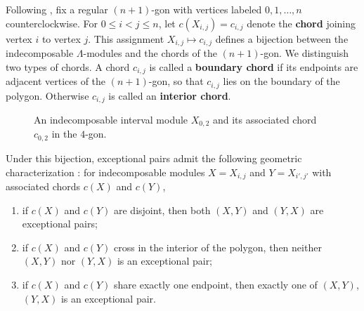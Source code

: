 \documentclass[12pt]{amsart}
\theoremstyle{definition}
\theoremstyle{remark}
\numberwithin{equation}{section}
\newcommand{\kk}{\ensuremath{\Bbbk}}
\begin{document}
Following \cite{araya2013exceptional}, fix a regular $(n+1)$-gon with vertices labeled $0, 1, \dots, n$ counterclockwise. For $0 \le i < j \le n$, let $c(X_{i,j}) = c_{i,j}$ denote the \textbf{chord} joining vertex $i$ to vertex $j$. This assignment $X_{i,j} \mapsto c_{i,j}$ defines a bijection between the indecomposable $\Lambda$-modules and the chords of the $(n+1)$-gon. We distinguish two types of chords. A chord $c_{i,j}$ is called a \textbf{boundary chord} if its endpoints are adjacent vertices of the $(n+1)$-gon, so that $c_{i,j}$ lies on the boundary of the polygon. Otherwise $c_{i,j}$ is called an \textbf{interior chord}.

\begin{figure}[h]
\centering
{}
\caption{An indecomposable interval module $X_{0,2}$ and its associated chord $c_{0,2}$ in the $4$-gon.}
\label{fig: interval module}
\end{figure}

Under this bijection, exceptional pairs admit the following geometric characterization \cite[Lemma~3.2]{araya2013exceptional}: for indecomposable modules $X = X_{i,j}$ and $Y = X_{i',j'}$ with associated chords $c(X)$ and $c(Y)$,
\begin{enumerate}[label=(\arabic*)]
    \item if $c(X)$ and $c(Y)$ are disjoint, then both $(X,Y)$ and $(Y,X)$ are exceptional pairs;
    \item if $c(X)$ and $c(Y)$ cross in the interior of the polygon, then neither $(X,Y)$ nor $(Y,X)$ is an exceptional pair;
    \item if $c(X)$ and $c(Y)$ share exactly one endpoint, then exactly one of $(X,Y)$, $(Y,X)$ is an exceptional pair.
\end{enumerate}
\end{document}
